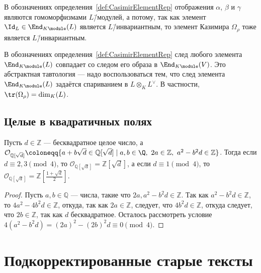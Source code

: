 \documentclass[
	extrafontsizes,
	11pt,
	hyphens,
]{memoir}
\begin{document}
\begin{observation}
В обозначениях определения~\ref{def:CasimirElementRep}
отображения \(\alpha\), \(\beta\) и \(\gamma\)
являются гомоморфизмами \(L\)\=/модулей,
а потому, так как элемент \(\Id_L \in \End_{K\module}(L)\) является \(L\)\=/инвариантным, то элемент Казимира \(\Omega_{\rho}\) тоже является \(L\)\=/инвариантным.
\end{observation}

\begin{observation}
В обозначениях определения~\ref{def:CasimirElementRep} след любого элемента \(\End_{K\module}(L)\) совпадает со следом его образа в \(\End_{K\module}(V)\).
Это абстрактная тавтология --- надо воспользоваться тем, что след элемента \(\End_{K\module}(L)\) задаётся спариванием в \(L \otimes_K L^{\vee}\).
В частности, \(\tr(\Omega_{\rho}) = \dim_K(L)\).
\end{observation}


\section{Целые в квадратичных полях}

\begin{theorem}
Пусть \(d \in \mathbb{Z}\) --- бесквадратное целое число, а
\(
\mathcal{O}_{\mathbb{Q}[\sqrt{d}]} \coloneqq \{a+b\sqrt{d} \in \mathbb{Q}[\sqrt{d}] \mid a,b \in \Q,\ 2a \in \mathbb{Z},\ a^2-{b^2}d \in \mathbb{Z} \}
\).
Тогда если \(d \equiv 2,3 \pmod{4}\), то \(\mathcal{O}_{\mathbb{Q}[\sqrt{d}]} = \mathbb{Z}[\sqrt{d}]\), а если \(d \equiv 1 \pmod{4}\), то \(\mathcal{O}_{\mathbb{Q}[\sqrt{d}]} = \mathbb{Z}[\frac{1+\sqrt{d}}{2}]\).
\end{theorem}

\begin{proof}
Пусть \(a, b \in \mathbb{Q}\) --- числа, такие что \(2a, a^2-{b^2}d \in \mathbb{Z}\).
Так как \(a^2-{b^2}d \in \mathbb{Z}\), то \(4a^2-4{b^2}d \in \mathbb{Z}\), откуда, так как \(2a \in \mathbb{Z}\), следует, что \(4{b^2}d \in \mathbb{Z}\), откуда следует, что \(2b \in \mathbb{Z}\), так как \(d\) бесквадратное.
Осталось рассмотреть условие \(4(a^2-{b^2}d) = (2a)^2 - (2b)^2 d \equiv 0 \pmod{4}\).
\end{proof}



\chapter{Подкорректированные старые тексты}
\end{document}
